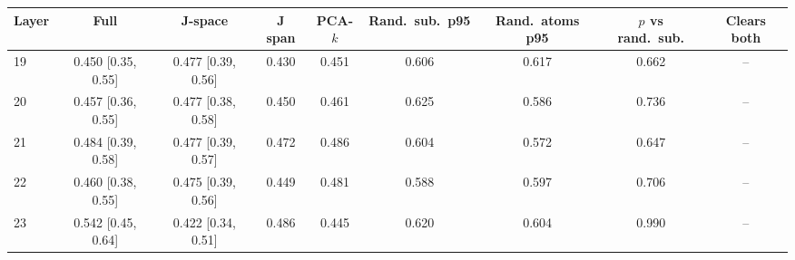 \begin{tabular}{lcccccccc}\toprule
Layer & Full & J-space & J span & PCA-$k$ & Rand.\ sub.\ p95 & Rand.\ atoms p95 & $p$ vs rand.\ sub. & Clears both\\\midrule
19 & 0.450 [0.35, 0.55] & 0.477 [0.39, 0.56] & 0.430 & 0.451 & 0.606 & 0.617 & 0.662 & --\\
20 & 0.457 [0.36, 0.55] & 0.477 [0.38, 0.58] & 0.450 & 0.461 & 0.625 & 0.586 & 0.736 & --\\
21 & 0.484 [0.39, 0.58] & 0.477 [0.39, 0.57] & 0.472 & 0.486 & 0.604 & 0.572 & 0.647 & --\\
22 & 0.460 [0.38, 0.55] & 0.475 [0.39, 0.56] & 0.449 & 0.481 & 0.588 & 0.597 & 0.706 & --\\
23 & 0.542 [0.45, 0.64] & 0.422 [0.34, 0.51] & 0.486 & 0.445 & 0.620 & 0.604 & 0.990 & --\\
\bottomrule\end{tabular}
